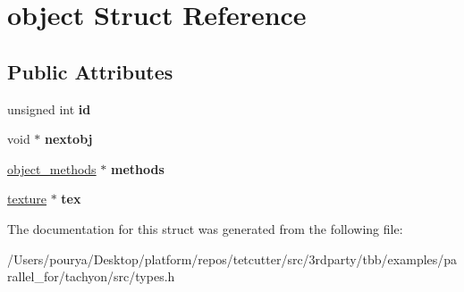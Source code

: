 \hypertarget{structobject}{}\section{object Struct Reference}
\label{structobject}
\subsection*{Public Attributes}
\begin{DoxyCompactItemize}
\item 
\hypertarget{structobject_a895ce377c757e57e2d6464d8642396b7}{}unsigned int {\bfseries id}\label{structobject_a895ce377c757e57e2d6464d8642396b7}

\item 
\hypertarget{structobject_ae5f359a8b8e85c6eaf113fa24ea6f59f}{}void $\ast$ {\bfseries nextobj}\label{structobject_ae5f359a8b8e85c6eaf113fa24ea6f59f}

\item 
\hypertarget{structobject_a9420bd981702f0b8722e760a4b2a3c9c}{}\hyperlink{structobject__methods}{object\+\_\+methods} $\ast$ {\bfseries methods}\label{structobject_a9420bd981702f0b8722e760a4b2a3c9c}

\item 
\hypertarget{structobject_a11875926a36060078e812c6927444f08}{}\hyperlink{structtexture}{texture} $\ast$ {\bfseries tex}\label{structobject_a11875926a36060078e812c6927444f08}

\end{DoxyCompactItemize}


The documentation for this struct was generated from the following file\+:\begin{DoxyCompactItemize}
\item 
/\+Users/pourya/\+Desktop/platform/repos/tetcutter/src/3rdparty/tbb/examples/parallel\+\_\+for/tachyon/src/types.\+h\end{DoxyCompactItemize}
